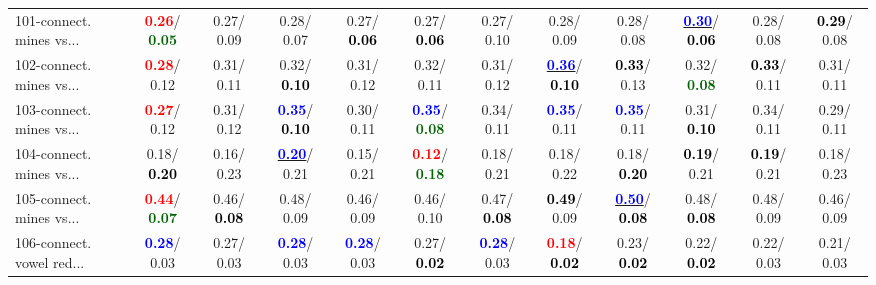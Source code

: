 \begin{table}[h]
\begin{center}
{\begin{tabular}{lc|c|c|c|c|c|c|c|c|c|c}
101-connect. mines vs... & \textcolor{red}{\textbf{  0.26}}/\textcolor{darkgreen}{\textbf{  0.05}} &   0.27/  0.09 &   0.28/  0.07 &   0.27/\textcolor{black}{\textbf{  0.06}} &   0.27/\textcolor{black}{\textbf{  0.06}} &   0.27/  0.10 &   0.28/  0.09 &   0.28/  0.08 & \underline{\textcolor{blue}{\textbf{  0.30}}}/\textcolor{black}{\textbf{  0.06}} &   0.28/  0.08 & \textcolor{black}{\textbf{  0.29}}/  0.08 \\
102-connect. mines vs... & \textcolor{red}{\textbf{  0.28}}/  0.12 &   0.31/  0.11 &   0.32/\textcolor{black}{\textbf{  0.10}} &   0.31/  0.12 &   0.32/  0.11 &   0.31/  0.12 & \underline{\textcolor{blue}{\textbf{  0.36}}}/\textcolor{black}{\textbf{  0.10}} & \textcolor{black}{\textbf{  0.33}}/  0.13 &   0.32/\textcolor{darkgreen}{\textbf{  0.08}} & \textcolor{black}{\textbf{  0.33}}/  0.11 &   0.31/  0.11 \\
103-connect. mines vs... & \textcolor{red}{\textbf{  0.27}}/  0.12 &   0.31/  0.12 & \textcolor{blue}{\textbf{  0.35}}/\textcolor{black}{\textbf{  0.10}} &   0.30/  0.11 & \textcolor{blue}{\textbf{  0.35}}/\textcolor{darkgreen}{\textbf{  0.08}} &   0.34/  0.11 & \textcolor{blue}{\textbf{  0.35}}/  0.11 & \textcolor{blue}{\textbf{  0.35}}/  0.11 &   0.31/\textcolor{black}{\textbf{  0.10}} &   0.34/  0.11 &   0.29/  0.11 \\ \hline
104-connect. mines vs... &   0.18/\textcolor{black}{\textbf{  0.20}} &   0.16/  0.23 & \underline{\textcolor{blue}{\textbf{  0.20}}}/  0.21 &   0.15/  0.21 & \textcolor{red}{\textbf{  0.12}}/\textcolor{darkgreen}{\textbf{  0.18}} &   0.18/  0.21 &   0.18/  0.22 &   0.18/\textcolor{black}{\textbf{  0.20}} & \textcolor{black}{\textbf{  0.19}}/  0.21 & \textcolor{black}{\textbf{  0.19}}/  0.21 &   0.18/  0.23 \\
105-connect. mines vs... & \textcolor{red}{\textbf{  0.44}}/\textcolor{darkgreen}{\textbf{  0.07}} &   0.46/\textcolor{black}{\textbf{  0.08}} &   0.48/  0.09 &   0.46/  0.09 &   0.46/  0.10 &   0.47/\textcolor{black}{\textbf{  0.08}} & \textcolor{black}{\textbf{  0.49}}/  0.09 & \underline{\textcolor{blue}{\textbf{  0.50}}}/\textcolor{black}{\textbf{  0.08}} &   0.48/\textcolor{black}{\textbf{  0.08}} &   0.48/  0.09 &   0.46/  0.09 \\
106-connect. vowel red... & \textcolor{blue}{\textbf{  0.28}}/  0.03 &   0.27/  0.03 & \textcolor{blue}{\textbf{  0.28}}/  0.03 & \textcolor{blue}{\textbf{  0.28}}/  0.03 &   0.27/\textcolor{black}{\textbf{  0.02}} & \textcolor{blue}{\textbf{  0.28}}/  0.03 & \textcolor{red}{\textbf{  0.18}}/\textcolor{black}{\textbf{  0.02}} &   0.23/\textcolor{black}{\textbf{  0.02}} &   0.22/\textcolor{black}{\textbf{  0.02}} &   0.22/  0.03 &   0.21/  0.03 \\

\end{tabular}}
\end{center}
\end{table}

